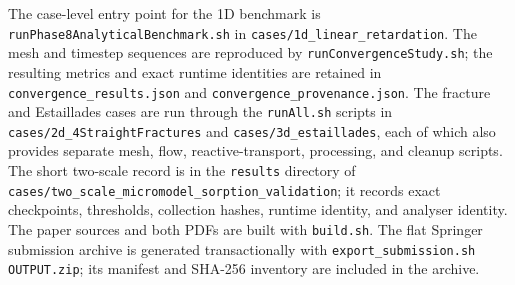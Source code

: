 \documentclass[pdflatex,sn-basic]{sn-jnl}
\begin{document}
The case-level entry point for the 1D benchmark is
\texttt{runPhase8AnalyticalBenchmark.sh} in
\nolinkurl{cases/1d_linear_retardation}. The mesh and timestep sequences are
reproduced by \texttt{runConvergenceStudy.sh}; the resulting metrics and exact
runtime identities are retained in \texttt{convergence\_results.json} and
\texttt{convergence\_provenance.json}. The fracture and Estaillades cases are
run through the \texttt{runAll.sh} scripts in
\nolinkurl{cases/2d_4StraightFractures} and \nolinkurl{cases/3d_estaillades},
each of which also provides separate mesh, flow, reactive-transport,
processing, and cleanup scripts. The short
two-scale record is in the \texttt{results} directory of
\nolinkurl{cases/two_scale_micromodel_sorption_validation}; it records exact
checkpoints, thresholds, collection hashes, runtime identity, and analyser
identity. The paper sources and both PDFs are built with \texttt{build.sh}. The
flat Springer submission archive is generated transactionally with
\texttt{export\_submission.sh OUTPUT.zip}; its manifest and SHA-256 inventory
are included in the archive.


\backmatter

\end{document}
